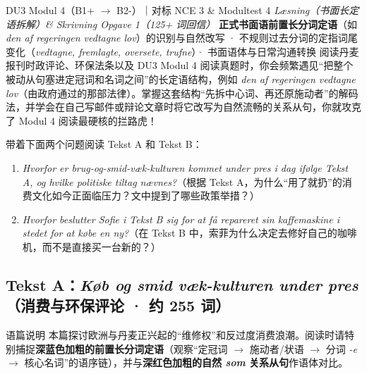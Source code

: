 {DU3 Modul 4（B1+ $\rightarrow$ B2-）｜对标 NCE 3 \& Modultest 4 \textit{Læsning（书面长定语拆解）\& Skrivning Opgave 1（125+ 词回信）}}
{\textbf{正式书面语前置长分词定语}（如 \textit{den af regeringen vedtagne lov}）的识别与自然改写 · 不规则过去分词的定指词尾变化（\textit{vedtagne, fremlagte, oversete, trufne}）· 书面语体与日常沟通转换}
{阅读丹麦报刊时政评论、环保法条以及 DU3 Modul 4 阅读真题时，你会频繁遇见“把整个被动从句塞进定冠词和名词之间”的长定语结构，例如 \textit{den af regeringen vedtagne lov}（由政府通过的那部法律）。掌握这套结构“先拆中心词、再还原施动者”的解码法，并学会在自己写邮件或辩论文章时将它改写为自然流畅的关系从句，你就攻克了 Modul 4 阅读最硬核的拦路虎！}

\begin{foerduleaeser}
带着下面两个问题阅读 Tekst A 和 Tekst B：
\begin{enumerate}
  \item \textit{Hvorfor er brug-og-smid-væk-kulturen kommet under pres i dag ifølge Tekst A, og hvilke politiske tiltag nævnes?}（根据 Tekst A，为什么“用了就扔”的消费文化如今正面临压力？文中提到了哪些政策举措？）
  \item \textit{Hvorfor beslutter Sofie i Tekst B sig for at få repareret sin kaffemaskine i stedet for at købe en ny?}（在 Tekst B 中，索菲为什么决定去修好自己的咖啡机，而不是直接买一台新的？）
\end{enumerate}
\end{foerduleaeser}


\subsection*{Tekst A：\textit{Køb og smid væk-kulturen under pres}（消费与环保评论 · 约 255 词）}

\begin{tipbox}{语篇说明}
本篇探讨欧洲与丹麦正兴起的“维修权”和反过度消费浪潮。阅读时请特别捕捉\textbf{\color{NCDNavy}深蓝色加粗的前置长分词定语}（观察“定冠词 $\rightarrow$ 施动者/状语 $\rightarrow$ 分词 \textit{-e} $\rightarrow$ 核心名词”的语序链），并与\textbf{\color{NCDRed}深红色加粗的自然 \textit{som} 关系从句}作语体对比。
\end{tipbox}

